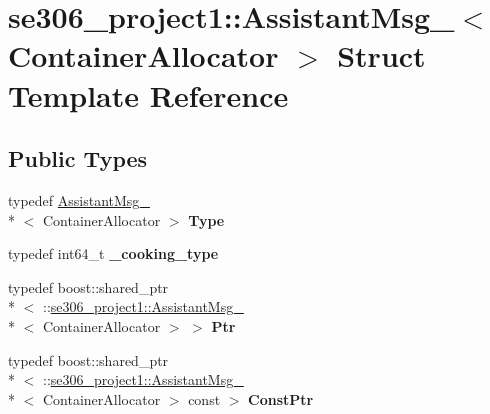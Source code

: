 \hypertarget{structse306__project1_1_1AssistantMsg__}{\section{se306\-\_\-project1\-:\-:Assistant\-Msg\-\_\-$<$ Container\-Allocator $>$ Struct Template Reference}
\label{structse306__project1_1_1AssistantMsg__}
}
\subsection*{Public Types}
\begin{DoxyCompactItemize}
\item 
\hypertarget{structse306__project1_1_1AssistantMsg___a1fd81595948c57178036f385b43b3e85}{typedef \hyperlink{structse306__project1_1_1AssistantMsg__}{Assistant\-Msg\-\_\-}\\*
$<$ Container\-Allocator $>$ {\bfseries Type}}\label{structse306__project1_1_1AssistantMsg___a1fd81595948c57178036f385b43b3e85}

\item 
\hypertarget{structse306__project1_1_1AssistantMsg___a2db029e9181031d6cdf1ada3c6b477e8}{typedef int64\-\_\-t {\bfseries \-\_\-cooking\-\_\-type}}\label{structse306__project1_1_1AssistantMsg___a2db029e9181031d6cdf1ada3c6b477e8}

\item 
\hypertarget{structse306__project1_1_1AssistantMsg___ae4e951cbe451656c3432adc85dac1d27}{typedef boost\-::shared\-\_\-ptr\\*
$<$ \-::\hyperlink{structse306__project1_1_1AssistantMsg__}{se306\-\_\-project1\-::\-Assistant\-Msg\-\_\-}\\*
$<$ Container\-Allocator $>$ $>$ {\bfseries Ptr}}\label{structse306__project1_1_1AssistantMsg___ae4e951cbe451656c3432adc85dac1d27}

\item 
\hypertarget{structse306__project1_1_1AssistantMsg___a96808a76b3826b3fe60f4733c576bb10}{typedef boost\-::shared\-\_\-ptr\\*
$<$ \-::\hyperlink{structse306__project1_1_1AssistantMsg__}{se306\-\_\-project1\-::\-Assistant\-Msg\-\_\-}\\*
$<$ Container\-Allocator $>$ const  $>$ {\bfseries Const\-Ptr}}\label{structse306__project1_1_1AssistantMsg___a96808a76b3826b3fe60f4733c576bb10}

\end{DoxyCompactItemize}
